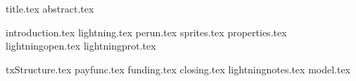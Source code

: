 \documentclass[11pt]{llncs}
\begin{document}
{title.tex}
\thispagestyle{plain}
{abstract.tex}

{introduction.tex}
{lightning.tex}
{perun.tex}
{sprites.tex}
{properties.tex}
{lightningopen.tex}
{lightningprot.tex}

{txStructure.tex}
{payfunc.tex}
{funding.tex}
{closing.tex}
{lightningnotes.tex}
{model.tex}

\end{document}
